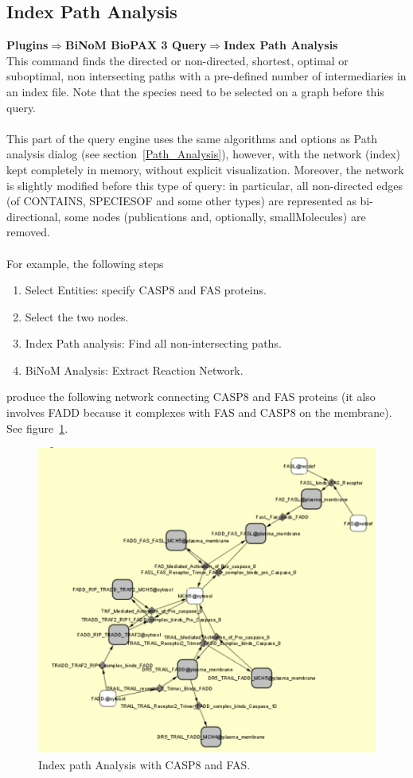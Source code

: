 \parbox{\textwidth}{
\subsection{Index Path Analysis}
\textbf{Plugins$\Rightarrow$BiNoM BioPAX 3 Query$\Rightarrow$Index Path Analysis}\\
This command finds the directed or non-directed, shortest, optimal or suboptimal, non intersecting paths with a pre-defined number of intermediaries in an index file. Note that the species need to be selected on a graph before this query.\\\\
This part of the query engine uses the same algorithms and options as Path analysis dialog (see section~\ref{Path_Analysis}), however, with the network (index) kept completely in memory, without explicit visualization. Moreover, the network is slightly modified before this type of query: in particular, all non-directed edges (of CONTAINS, SPECIESOF and some other types) are represented as bi-directional, some nodes (publications and, optionally, smallMolecules) are removed.\\\\
For example, the following steps
\begin{enumerate}
\item Select Entities: specify CASP8 and FAS proteins.
\item Select the two nodes.
\item Index Path analysis: Find all non-intersecting paths.
\item BiNoM Analysis: Extract Reaction Network.
\end{enumerate}
produce the following network connecting CASP8 and FAS proteins (it also involves FADD because it complexes with FAS and CASP8 on the membrane). See figure~\ref{Index_Path_Analysis}.
}
\begin{figure}[h]
\centering
\includegraphics[width=18 cm]{graphics/Index_Path_Analysis}
\caption{Index path Analysis with CASP8 and FAS.}
\label{Index_Path_Analysis}
\end{figure}

